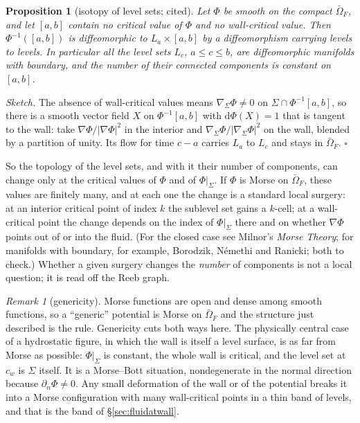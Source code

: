 \documentclass[11pt]{article}
\newtheorem{proposition}{Proposition}
\theoremstyle{definition}
\theoremstyle{remark}
\newtheorem{remark}{Remark}
\newcommand{\gradS}{\nabla_\Sigma}
\begin{document}
\begin{proposition}[isotopy of level sets; cited]
\label{prop:isotopy}
Let $\Phi$ be smooth on the compact $\bar\Omega_F$, and let $[a, b]$
contain no critical value of $\Phi$ and no wall-critical value. Then
$\Phi^{-1}([a, b])$ is diffeomorphic to $L_a\times[a, b]$ by a
diffeomorphism carrying levels to levels. In particular all the level
sets $L_c$, $a \le c \le b$, are diffeomorphic manifolds with
boundary, and the number of their connected components is constant on
$[a, b]$.
\end{proposition}

\emph{Sketch.} The absence of wall-critical values means $\gradS\Phi
\ne 0$ on $\Sigma\cap\Phi^{-1}[a, b]$, so there is a smooth vector
field $X$ on $\Phi^{-1}[a, b]$ with $\mathrm d\Phi(X) = 1$ that is
tangent to the wall: take $\nabla\Phi/|\nabla\Phi|^2$ in the interior
and $\gradS\Phi/|\gradS\Phi|^2$ on the wall, blended by a partition of
unity. Its flow for time $c - a$ carries $L_a$ to $L_c$ and stays in
$\bar\Omega_F$. \hfill$\square$

So the topology of the level sets, and with it their number of
components, can change only at the critical values of $\Phi$ and of
$\Phi|_\Sigma$. If $\Phi$ is Morse on $\bar\Omega_F$, these values are
finitely many, and at each one the change is a standard local
surgery: at an interior critical point of index $k$ the sublevel set
gains a $k$-cell; at a wall-critical point the change depends on the
index of $\Phi|_\Sigma$ there and on whether $\nabla\Phi$ points out of
or into the fluid. (For the closed case see Milnor's \emph{Morse
Theory}; for manifolds with boundary, for example, Borodzik, N\'emethi
and Ranicki; both to check.) Whether a given surgery changes the
\emph{number} of components is not a local question; it is read off
the Reeb graph.

\begin{remark}[genericity]
\label{rem:genericity}
Morse functions are open and dense among smooth functions, so a
``generic'' potential is Morse on $\bar\Omega_F$ and the structure just
described is the rule. Genericity cuts both ways here. The physically
central case of a hydrostatic figure, in which the wall is itself a
level surface, is as far from Morse as possible: $\Phi|_\Sigma$ is
constant, the whole wall is critical, and the level set at $c_w$ is
$\Sigma$ itself. It is a Morse--Bott situation, nondegenerate in the
normal direction because $\partial_n\Phi \ne 0$. Any small deformation
of the wall or of the potential breaks it into a Morse configuration
with many wall-critical points in a thin band of levels, and that is
the band of \S\ref{sec:fluidatwall}.
\end{remark}
\end{document}

